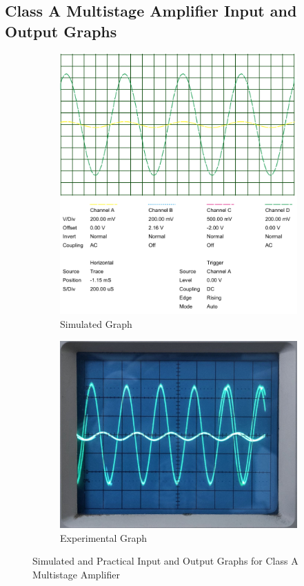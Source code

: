 \documentclass[12pt]{article}
\begin{document}
\subsection{Class A Multistage Amplifier Input and Output Graphs}

\begin{figure}[h!]
    \centering
    \begin{subfigure}{0.45\textwidth}
        \includegraphics[width=\textwidth]{Simulated_graph.png}
        \caption{Simulated Graph}
    \end{subfigure}
    \begin{subfigure}{0.45\textwidth}
        \includegraphics[width=\textwidth]{Practical_graph.jpg}
        \caption{Experimental Graph}
    \end{subfigure}
    \caption{Simulated and Practical Input and Output Graphs for Class A Multistage Amplifier}
\end{figure}
\end{document}
